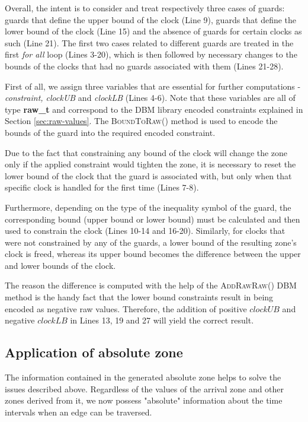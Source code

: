 Overall, the intent is to consider and treat respectively three cases of guards: guards that define the upper bound of the clock (Line 9), guards that define the lower bound of the clock (Line 15) and the absence of guards for certain clocks as such (Line 21). The first two cases related to different guards are treated in the first \textit{for all} loop (Lines 3-20), which is then followed by necessary changes to the bounds of the clocks that had no guards associated with them (Lines 21-28).

First of all, we assign three variables that are essential for further computations - \textit{constraint, clockUB} and \textit{clockLB} (Lines 4-6). Note that these variables are all of type \textbf{raw\_t} and correspond to the DBM library encoded constraints explained in Section \ref{sec:raw-values}. The \textsc{BoundToRaw()} method is used to encode the bounds of the guard into the required encoded constraint.

Due to the fact that constraining any bound of the clock will change the zone only if the applied constraint would tighten the zone, it is necessary to reset the lower bound of the clock that the guard is associated with, but only when that specific clock is handled for the first time (Lines 7-8).

Furthermore, depending on the type of the inequality symbol of the guard, the corresponding bound (upper bound or lower bound) must be calculated and then used to constrain the clock (Lines 10-14 and 16-20). Similarly, for clocks that were not constrained by any of the guards, a lower bound of the resulting zone's clock is freed, whereas its upper bound becomes the difference between the upper and lower bounds of the clock. 

The reason the difference is computed with the help of the \textsc{AddRawRaw()} DBM method is the handy fact that the lower bound constraints result in being encoded as negative raw values. Therefore, the addition of positive $clockUB$ and negative $clockLB$ in Lines 13, 19 and 27 will yield the correct result.

\subsection{Application of absolute zone}
The information contained in the generated absolute zone helps to solve the issues described above. Regardless of the values of the arrival zone and other zones derived from it, we now possess "absolute" information about the time intervals when an edge can be traversed. 


